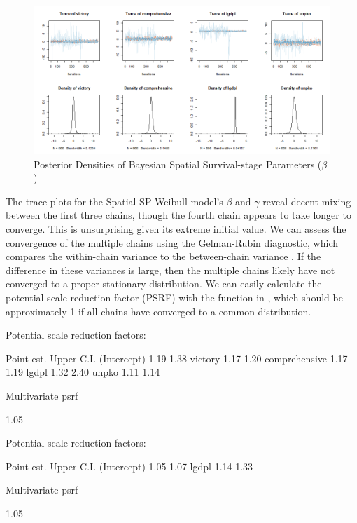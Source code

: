 \begin{figure}[!htb]
\begin{center} 
\includegraphics[width=\textwidth]{figures/betamultiple.png}
\end{center}
\caption{Posterior Densities of Bayesian Spatial Survival-stage Parameters ($\beta$)}
\label{figurex}
\end{figure}

The trace plots for the Spatial SP Weibull model's $\beta$ and $\gamma$ reveal decent mixing between the first three chains, though the fourth chain appears to take longer to converge. This is unsurprising given its extreme initial value. We can assess the convergence of the multiple chains using the Gelman-Rubin diagnostic, which compares the within-chain variance to the between-chain variance \citep{gelman}. If the difference in these variances is large, then the multiple chains likely have not converged to a proper stationary distribution. We can easily calculate the potential scale reduction factor (PSRF) with the  function in , which should be approximately 1 if all chains have converged to a common distribution. 

\begin{example}
Potential scale reduction factors:

              Point est. Upper C.I.
(Intercept)         1.19       1.38
victory             1.17       1.20
comprehensive       1.17       1.19
lgdpl               1.32       2.40
unpko               1.11       1.14

Multivariate psrf

1.05
\end{example}
 
\begin{example}
Potential scale reduction factors:

            Point est. Upper C.I.
(Intercept)       1.05       1.07
lgdpl             1.14       1.33

Multivariate psrf

1.05

\end{example}

